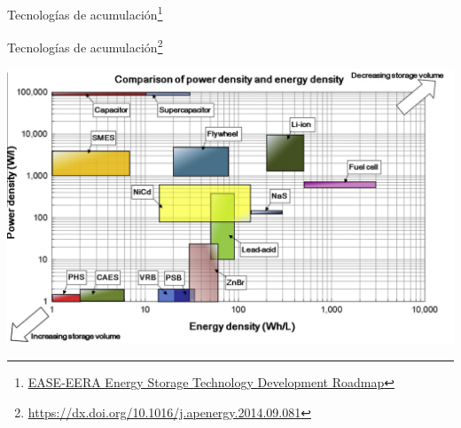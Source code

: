\documentclass[aspectratio=169, usenames,svgnames,dvipsnames]{beamer}
\begin{document}
\begin{frame}[label={sec:org3697876}]{Tecnologías de acumulación\footnote{\href{https://ease-storage.eu/publication/ease-eera-energy-storage-technology-development-roadmap-2017/}{EASE-EERA Energy Storage Technology Development Roadmap}}}
\begin{center}
  \end{center}
\end{frame}

\begin{frame}[label={sec:orgaed06e3}]{Tecnologías de acumulación\footnote{\url{https://dx.doi.org/10.1016/j.apenergy.2014.09.081}}}
\begin{center}
\includegraphics[height=0.8\textheight]{../figs/SistemasAcumulacion_DensidadPotenciaEnergia.png}
\end{center}
\end{frame}
\end{document}
